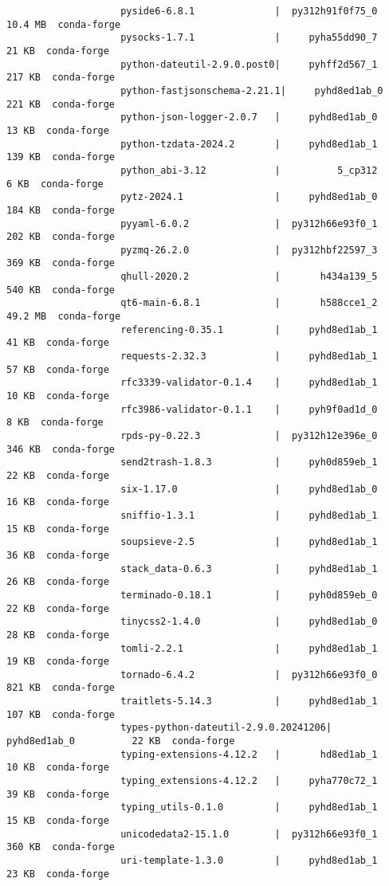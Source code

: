 \documentclass{article}
\begin{document}
\begin{enumerate}
\begin{itemize}
\begin{itemize}
\begin{itemize}
\begin{verbatim}
					pyside6-6.8.1              |  py312h91f0f75_0        10.4 MB  conda-forge
					pysocks-1.7.1              |     pyha55dd90_7          21 KB  conda-forge
					python-dateutil-2.9.0.post0|     pyhff2d567_1         217 KB  conda-forge
					python-fastjsonschema-2.21.1|     pyhd8ed1ab_0         221 KB  conda-forge
					python-json-logger-2.0.7   |     pyhd8ed1ab_0          13 KB  conda-forge
					python-tzdata-2024.2       |     pyhd8ed1ab_1         139 KB  conda-forge
					python_abi-3.12            |          5_cp312           6 KB  conda-forge
					pytz-2024.1                |     pyhd8ed1ab_0         184 KB  conda-forge
					pyyaml-6.0.2               |  py312h66e93f0_1         202 KB  conda-forge
					pyzmq-26.2.0               |  py312hbf22597_3         369 KB  conda-forge
					qhull-2020.2               |       h434a139_5         540 KB  conda-forge
					qt6-main-6.8.1             |       h588cce1_2        49.2 MB  conda-forge
					referencing-0.35.1         |     pyhd8ed1ab_1          41 KB  conda-forge
					requests-2.32.3            |     pyhd8ed1ab_1          57 KB  conda-forge
					rfc3339-validator-0.1.4    |     pyhd8ed1ab_1          10 KB  conda-forge
					rfc3986-validator-0.1.1    |     pyh9f0ad1d_0           8 KB  conda-forge
					rpds-py-0.22.3             |  py312h12e396e_0         346 KB  conda-forge
					send2trash-1.8.3           |     pyh0d859eb_1          22 KB  conda-forge
					six-1.17.0                 |     pyhd8ed1ab_0          16 KB  conda-forge
					sniffio-1.3.1              |     pyhd8ed1ab_1          15 KB  conda-forge
					soupsieve-2.5              |     pyhd8ed1ab_1          36 KB  conda-forge
					stack_data-0.6.3           |     pyhd8ed1ab_1          26 KB  conda-forge
					terminado-0.18.1           |     pyh0d859eb_0          22 KB  conda-forge
					tinycss2-1.4.0             |     pyhd8ed1ab_0          28 KB  conda-forge
					tomli-2.2.1                |     pyhd8ed1ab_1          19 KB  conda-forge
					tornado-6.4.2              |  py312h66e93f0_0         821 KB  conda-forge
					traitlets-5.14.3           |     pyhd8ed1ab_1         107 KB  conda-forge
					types-python-dateutil-2.9.0.20241206|     pyhd8ed1ab_0          22 KB  conda-forge
					typing-extensions-4.12.2   |       hd8ed1ab_1          10 KB  conda-forge
					typing_extensions-4.12.2   |     pyha770c72_1          39 KB  conda-forge
					typing_utils-0.1.0         |     pyhd8ed1ab_1          15 KB  conda-forge
					unicodedata2-15.1.0        |  py312h66e93f0_1         360 KB  conda-forge
					uri-template-1.3.0         |     pyhd8ed1ab_1          23 KB  conda-forge

\end{verbatim}
\end{itemize}
\end{itemize}
\end{itemize}
\end{enumerate}
\end{document}
